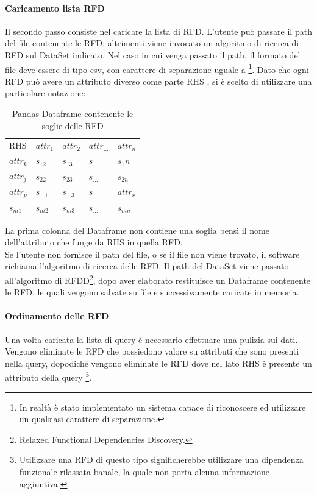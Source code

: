 \paragraph{Caricamento lista RFD}
Il secondo passo consiste nel caricare la lista di RFD. L'utente può passare il path del file contenente le RFD, altrimenti viene invocato un algoritmo di ricerca di RFD sul DataSet indicato.
Nel caso in cui venga passato il path, il formato del file deve essere di tipo csv, con carattere di separazione uguale a \quotes{;} \footnote{In realtà è stato implementato un sistema capace di riconoscere ed utilizzare un qualsiasi carattere di separazione.}.
Dato che ogni RFD può avere un attributo diverso come parte RHS , si è scelto di utilizzare una particolare notazione:
\begin{table}[H]
    \centering
    \begin{tabular}{l l l l l }
     RHS & $attr_1$ & $attr_2$ & $attr_{\ldots}$ & $attr_n$ \\
    $attr_{k}$ & $s_{12}$ & $s_{13}$ & $s_{\ldots}$ & $s_1n$  \\
    $attr_{j}$ & $s_{22}$ & $s_{23}$  & $s_{\ldots}$ & $s_{2n}$\\
    $attr_{p}$ & $s_{\ldots1}$ & $s_{\ldots3}$  & $s_{\ldots}$ & $attr_{r}$\\
    $s_{m1}$ & $s_{m2}$ & $s_{m3}$ & $s_{\ldots}$ & $s_{mn}$\\
    \end{tabular}
    \caption{Pandas Dataframe contenente le soglie delle RFD}
    \label{tab:RFD_notation}
\end{table}

La prima colonna del Dataframe non contiene una soglia bensì il nome dell'attributo che funge da RHS in quella RFD.
\\
Se l'utente non fornisce il path del file, o se il file non viene trovato, il software richiama l'algoritmo di ricerca delle RFD. Il path del DataSet viene passato all'algoritmo di RFDD\footnote{Relaxed Functional Dependencies Discovery.}, dopo aver elaborato restituisce un Dataframe contenente le RFD, le quali vengono salvate su file e successivamente caricate in memoria.
\paragraph{Ordinamento delle RFD}
Una volta caricata la lista di query è necessario effettuare una pulizia sui dati.
Vengono eliminate le RFD che possiedono valore  su attributi che sono presenti nella query, dopodiché vengono eliminate le RFD dove nel lato RHS è presente un attributo della query \footnote{Utilizzare una RFD di questo tipo significherebbe utilizzare una dipendenza funzionale rilassata banale, la quale non porta alcuna informazione aggiuntiva.}.

